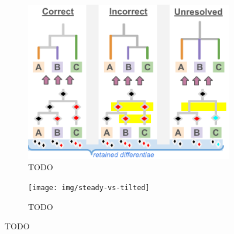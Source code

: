 \begin{figure}
  \centering
  \begin{subfigure}[b]{0.5\textwidth}
    \centering
    \includegraphics[width=\textwidth]{img/hstrat-failure-modes}
    \caption{TODO}
    \label{fig:example-TODO}
  \end{subfigure}%
  \begin{subfigure}[b]{0.5\textwidth}
    \centering
    \texttt{[image: img/steady-vs-tilted]}
    \caption{TODO}
    \label{fig:example-TODO}
  \end{subfigure}
  \caption{TODO}
  \label{fig:example}
\end{figure}
